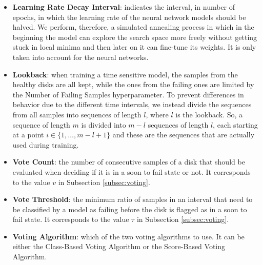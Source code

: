 \begin{itemize}
  \item \textbf{Learning Rate Decay Interval}: indicates the interval, in number of epochs, in which the learning rate of the neural network models should be halved.
  We perform, therefore, a simulated annealing process in which in the beginning the model can explore the search space more freely without getting stuck in local minima and then later on it can fine-tune its weights.
  It is only taken into account for the neural networks.

  \item \textbf{Lookback}: when training a time sensitive model, the samples from the healthy disks are all kept, while the ones from the failing ones are limited by the Number of Failing Samples hyperparameter.
  To prevent differences in behavior due to the different time intervals, we instead divide the sequences from all samples into sequences of length $l$, where $l$ is the lookback.
  So, a sequence of length $m$ is divided into $m-l$ sequences of length $l$, each starting at a point $i \in \{1,\dots,m-l+1\}$ and these are the sequences that are actually used during training.

  \item \textbf{Vote Count}: the number of consecutive samples of a disk that should be evaluated when deciding if it is in a soon to fail state or not.
  It corresponds to the value $v$ in Subsection \ref{subsec:voting}.

  \item \textbf{Vote Threshold}: the minimum ratio of samples in an interval that need to be classified by a model as failing before the disk is flagged as in a soon to fail state.
  It corresponds to the value $\tau$ in Subsection \ref{subsec:voting}.

  \item \textbf{Voting Algorithm}: which of the two voting algorithms to use.
  It can be either the Class-Based Voting Algorithm or the Score-Based Voting Algorithm.
  
\end{itemize}